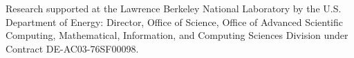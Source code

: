 Research supported at the Lawrence Berkeley National
Laboratory by the U.S. Department of Energy: Director, Office of
Science, Office of Advanced Scientific Computing, Mathematical,
Information, and Computing Sciences Division under Contract
DE-AC03-76SF00098.